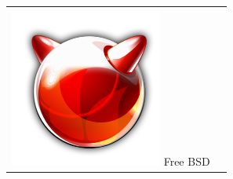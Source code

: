 \documentclass[xcolor=table]{beamer}
\begin{document}
\begin{frame}
\begin{tabular}{ll}
	\includegraphics[height=.25\textheight]{..//img/Bweb01-environnement/freebsd.png} 
	Free BSD &
	\\
	
\end{tabular}

\end{frame}
\end{document}
